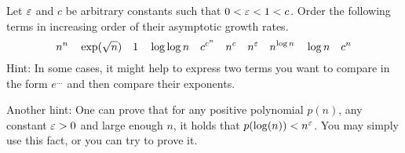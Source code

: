 \documentclass[a4paper,10pt,landscape,twocolumn]{scrartcl}
\begin{document}
\begin{exercise}
Let $\varepsilon$ and $c$ be arbitrary constants such that $0<\varepsilon<1<c$. Order the following terms in increasing order of their
  asymptotic growth rates.
\[ n^n \quad \exp(\sqrt{n}) \quad 1 \quad \log\log n \quad
c^{c^n} \quad n^c \quad n^\varepsilon \quad n^{\log n} \quad \log n \quad c^n
\]
{\small Hint: In some cases, it might help to express two terms you
  want to compare in the form $e^{\ldots}$ and then compare their
  exponents.}

{\small Another hint: One can prove that for any positive polynomial
  $p(n)$, any constant $\varepsilon>0$ and large enough $n$, it holds that
  $p(\log(n)) < n^\varepsilon$. You may simply use this fact, or you can try
  to prove it.}
\end{exercise}
\end{document}
